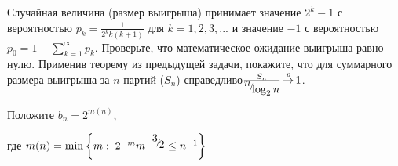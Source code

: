\begin{problem}

Случайная величина (размер выигрыша) принимает значение $2^{k} -1$ с вероятностью $p_{k} =\frac{1}{2^{k} k(k+1)} $ для $k=1,2,3,...$ и значение\textit{ $-1$} с вероятностью $p_{0} =1-\sum _{k=1}^{\infty }p_{k}  $. Проверьте, что математическое ожидание выигрыша равно нулю. Применив теорему из предыдущей задачи, покажите, что для суммарного размера выигрыша за $n$ партий ($S_{n} $) справедливо$\frac{S_{n} }{{\raise0.7ex\hbox{$ n $}\!\mathord{\left/ {\vphantom {n \log _{2} n}} \right. \kern-\nulldelimiterspace}\!\lower0.7ex\hbox{$ \log _{2} n $}} } \mathop{\to }\limits^{p} 1$.

\begin{ordre}  
Положите $b_{n} =2^{m(n)} $,

 где $m(n)=\min \left\{m:\; 2^{-m} m^{-{\raise0.7ex\hbox{$ 3 $}\!\mathord{\left/ {\vphantom {3 2}} \right. \kern-\nulldelimiterspace}\!\lower0.7ex\hbox{$ 2 $}} } \le n^{-1} \right\}$
\end{ordre} 

\end{problem}

